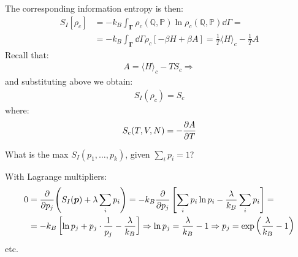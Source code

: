 \documentclass[../template.tex]{subfiles}
\begin{document}
\begin{enumerate}
\begin{itemize}
        The corresponding information entropy is then:
        \begin{align*}
            S_I[\rho_c] &= -k_B \int_{\bm{\Gamma}} \rho_c (\mathbb{Q}, \mathbb{P}) \ln \rho_c(\mathbb{Q}, \mathbb{P}) \dd{\Gamma} = \\
            &= -k_B \int_{\bm{\Gamma}} \dd{\Gamma} \rho_c [-\beta H + \beta A] = \frac{1}{T} \langle H \rangle_c - \frac{1}{T} A 
        \end{align*}
        Recall that:
        \begin{align*}
            A = \langle H \rangle_c - T S_c \Rightarrow 
        \end{align*}
        and substituting above we obtain:
        \begin{align*}
            S_I(\rho_c) = S_c
        \end{align*}
        where:
        \begin{align*}
            S_c(T,V,N) = - \pdv{A}{T}(T,V,N)
        \end{align*}
    \end{itemize}
    What is the max $S_I(p_1, \dots, p_k)$, given $\sum_i p_i = 1$?
\end{enumerate}

With Lagrange multipliers:
\begin{align*}
    0 &= \pdv{p_j} (S_I(\bm{p}) + \lambda \sum_i p_i) = -k_B \pdv{p_j} \left[\sum_i p_i \ln p_i - \frac{\lambda}{k_B} \sum_i p_i \right] =\\
    &= -k_B \left[\ln p_j + p_j \cdot \frac{1}{p_j} - \frac{\lambda}{k_B}  \right] \Rightarrow \ln p_j = \frac{\lambda}{k_B} -1 \Rightarrow p_j = \exp\left(\frac{\lambda}{k_B}-1 \right) 
\end{align*}
etc.

\begin{comment}
    See Sethna ch. 5, sec. 5.3.2 and exercise 5.17
    Suggested references:
    -Statistical Mechanics in a nutshell, J. Rau, arxiv:physics/980524
    Information theory, Cover & Thomas (Wiley)
\end{comment}
\end{document}
